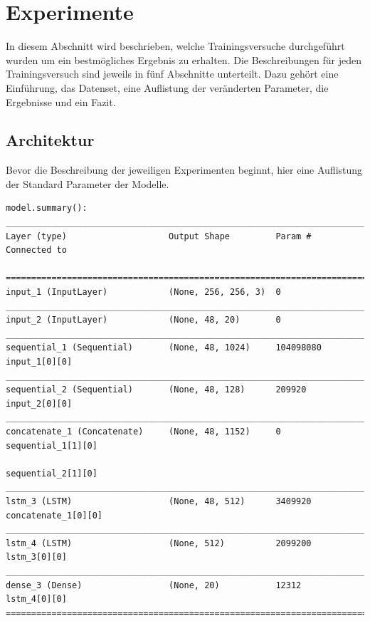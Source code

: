 \documentclass[pdftex,a4paper,halfparskip, article]{scrartcl}
\begin{document}
\section{Experimente}

In diesem Abschnitt wird beschrieben, welche Trainingsversuche durchgeführt wurden um ein bestmögliches Ergebnis zu erhalten. Die Beschreibungen für jeden Trainingsversuch sind jeweils in fünf Abschnitte unterteilt. Dazu gehört eine Einführung, das Datenset, eine Auflistung der veränderten Parameter, die Ergebnisse und ein Fazit.

\subsection{Architektur}\label{sub:architektur}
Bevor die Beschreibung der jeweiligen Experimenten beginnt, hier eine Auflistung der Standard Parameter der Modelle. 

\begin{verbatim}
model.summary():
________________________________________________________________________________
Layer (type)                    Output Shape         Param #     Connected to

================================================================================
input_1 (InputLayer)            (None, 256, 256, 3)  0
________________________________________________________________________________
input_2 (InputLayer)            (None, 48, 20)       0
________________________________________________________________________________
sequential_1 (Sequential)       (None, 48, 1024)     104098080   input_1[0][0]
________________________________________________________________________________
sequential_2 (Sequential)       (None, 48, 128)      209920      input_2[0][0]
________________________________________________________________________________
concatenate_1 (Concatenate)     (None, 48, 1152)     0           sequential_1[1][0]
                                                                 sequential_2[1][0]
________________________________________________________________________________
lstm_3 (LSTM)                   (None, 48, 512)      3409920     concatenate_1[0][0]
________________________________________________________________________________
lstm_4 (LSTM)                   (None, 512)          2099200     lstm_3[0][0]
________________________________________________________________________________
dense_3 (Dense)                 (None, 20)           12312       lstm_4[0][0]
================================================================================
\end{verbatim}
\end{document}

